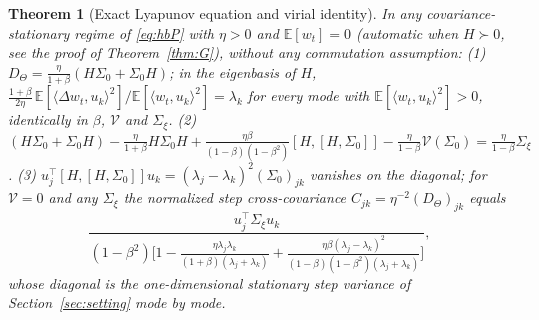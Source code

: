 \documentclass[11pt]{article}
\newtheorem{theorem}{Theorem}
\theoremstyle{remark}
\newcommand{\E}{\mathbb{E}}
\begin{document}
\begin{theorem}[Exact Lyapunov equation and virial identity]\label{thm:F}
In any covariance-stationary regime of \eqref{eq:hbP} with $\eta>0$ and $\E[w_t]=0$ (automatic when $H\succ0$, see the proof of Theorem~\ref{thm:G}), without any commutation assumption:
(1) $D_\Theta=\frac{\eta}{1+\beta}(H\Sigma_0+\Sigma_0H)$; in the eigenbasis of $H$, $\frac{1+\beta}{2\eta}\,\E[\langle\Delta w_t,u_k\rangle^2]/\E[\langle w_t,u_k\rangle^2]=\lambda_k$ for every mode with $\E[\langle w_t,u_k\rangle^2]>0$, identically in $\beta$, $\mathcal V$ and $\Sigma_\xi$.
(2) $(H\Sigma_0+\Sigma_0H)-\frac{\eta}{1+\beta}H\Sigma_0H+\frac{\eta\beta}{(1-\beta)(1-\beta^2)}[H,[H,\Sigma_0]]-\frac{\eta}{1-\beta}\mathcal V(\Sigma_0)=\frac{\eta}{1-\beta}\Sigma_\xi$.
(3) $u_j^\top[H,[H,\Sigma_0]]u_k=(\lambda_j-\lambda_k)^2(\Sigma_0)_{jk}$ vanishes on the diagonal; for $\mathcal V=0$ and any $\Sigma_\xi$ the normalized step cross-covariance $C_{jk}=\eta^{-2}(D_\Theta)_{jk}$ equals
\[
\frac{u_j^\top\Sigma_\xi u_k}{(1-\beta^2)\Big[1-\frac{\eta\lambda_j\lambda_k}{(1+\beta)(\lambda_j+\lambda_k)}+\frac{\eta\beta(\lambda_j-\lambda_k)^2}{(1-\beta)(1-\beta^2)(\lambda_j+\lambda_k)}\Big]},
\]
whose diagonal is the one-dimensional stationary step variance of Section~\ref{sec:setting} mode by mode.
\end{theorem}
\end{document}
